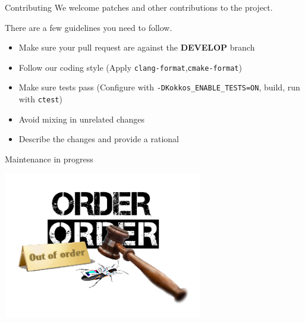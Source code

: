 \begin{frame}[fragile]{Contributing}
We welcome patches and other contributions to the project.

There are a few guidelines you need to follow.

\begin{itemize}
\item Make sure your pull request are against the \textbf{DEVELOP} branch
\item Follow our coding style (Apply \texttt{clang-format},\texttt{cmake-format})
\item Make sure tests pass (Configure with \texttt{-DKokkos\_ENABLE\_TESTS=ON}, build, run with \texttt{ctest})
\item Avoid mixing in unrelated changes
\item Describe the changes and provide a rational
\end{itemize}
\end{frame}

\begin{frame}[fragile]{Maintenance in progress}
\begin{center}
\includegraphics[width=0.65\textwidth]{figures/kokkos-orderorder}
\end{center}
\end{frame}

